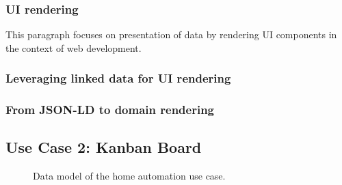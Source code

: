 \subsubsection{UI rendering}\label{genericrendering}
This paragraph focuses on presentation of data by rendering UI components in the context of web development.
\subsubsection{Leveraging linked data for UI rendering}\label{linkeddatarendering}
\subsubsection{From JSON-LD to domain rendering}\label{domainrendering}

\subsection{Use Case 2: Kanban Board}

\begin{figure}[!htb]
  \caption{Data model of the home automation use case.}
\end{figure}

